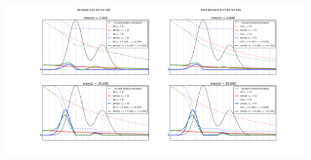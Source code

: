 \documentclass[11pt]{article}
\begin{document}
\includegraphics[width=.9\linewidth]{orographic-precip.png}



\end{document}
